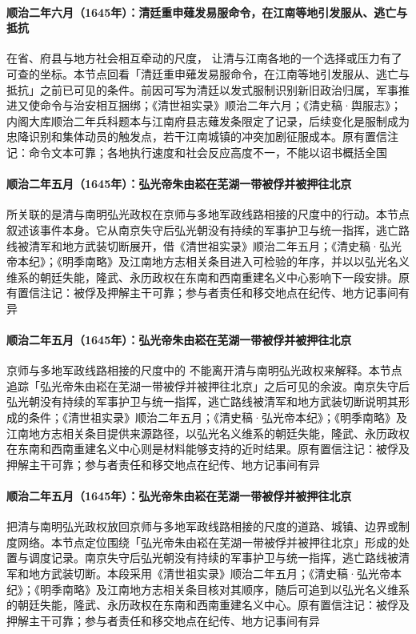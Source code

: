 \paragraph{顺治二年六月（1645年）：清廷重申薙发易服命令，在江南等地引发服从、逃亡与抵抗}
在省、府县与地方社会相互牵动的尺度， 让清与江南各地的一个选择或压力有了可查的坐标。本节点回看「清廷重申薙发易服命令，在江南等地引发服从、逃亡与抵抗」之前已可见的条件。前因可写为清廷以发式服制识别新旧政治归属，军事推进又使命令与治安相互捆绑；《清世祖实录》顺治二年六月；《清史稿·舆服志》；内阁大库顺治二年兵科题本与江南府县志薙发条限定了记录，后续变化是服制成为忠降识别和集体动员的触发点，若干江南城镇的冲突加剧征服成本。原有置信注记：命令文本可靠；各地执行速度和社会反应高度不一，不能以诏书概括全国

\paragraph{顺治二年五月（1645年）：弘光帝朱由崧在芜湖一带被俘并被押往北京}
 所关联的是清与南明弘光政权在京师与多地军政线路相接的尺度中的行动。本节点叙述该事件本身。它从南京失守后弘光朝没有持续的军事护卫与统一指挥，逃亡路线被清军和地方武装切断展开，借《清世祖实录》顺治二年五月；《清史稿·弘光帝本纪》；《明季南略》及江南地方志相关条目进入可检验的年序，并以以弘光名义维系的朝廷失能，隆武、永历政权在东南和西南重建名义中心影响下一段安排。原有置信注记：被俘及押解主干可靠；参与者责任和移交地点在纪传、地方记事间有异

\paragraph{顺治二年五月（1645年）：弘光帝朱由崧在芜湖一带被俘并被押往北京}
京师与多地军政线路相接的尺度中的 不能离开清与南明弘光政权来解释。本节点追踪「弘光帝朱由崧在芜湖一带被俘并被押往北京」之后可见的余波。南京失守后弘光朝没有持续的军事护卫与统一指挥，逃亡路线被清军和地方武装切断说明其形成的条件；《清世祖实录》顺治二年五月；《清史稿·弘光帝本纪》；《明季南略》及江南地方志相关条目提供来源路径，以弘光名义维系的朝廷失能，隆武、永历政权在东南和西南重建名义中心则是材料能够支持的近时结果。原有置信注记：被俘及押解主干可靠；参与者责任和移交地点在纪传、地方记事间有异

\paragraph{顺治二年五月（1645年）：弘光帝朱由崧在芜湖一带被俘并被押往北京}
 把清与南明弘光政权放回京师与多地军政线路相接的尺度的道路、城镇、边界或制度网络。本节点定位围绕「弘光帝朱由崧在芜湖一带被俘并被押往北京」形成的处置与调度记录。南京失守后弘光朝没有持续的军事护卫与统一指挥，逃亡路线被清军和地方武装切断。本段采用《清世祖实录》顺治二年五月；《清史稿·弘光帝本纪》；《明季南略》及江南地方志相关条目核对其顺序，随后可追到以弘光名义维系的朝廷失能，隆武、永历政权在东南和西南重建名义中心。原有置信注记：被俘及押解主干可靠；参与者责任和移交地点在纪传、地方记事间有异

